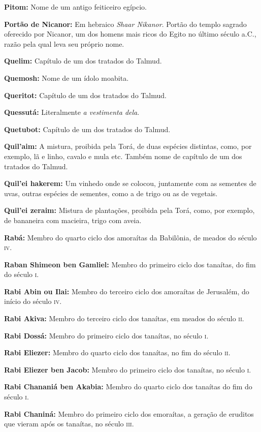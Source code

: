\begin{hangparas}{.25in}{1}
{\textbf{Pitom:} Nome de um antigo feiticeiro egípcio.

\textbf{Portão de Nicanor:} Em hebraico \emph{Shaar Nikanor}. 
Portão do templo sagrado oferecido por Nicanor, um dos homens mais ricos 
do Egito no último século a.C., razão pela qual 
leva seu próprio nome.

\textbf{Quelim:} Capítulo de um dos tratados do Talmud.

\textbf{Quemosh:} Nome de um ídolo moabita.

\textbf{Queritot:} Capítulo de um dos tratados do Talmud.

\textbf{Quessutá:} Literalmente \emph{a vestimenta dela}.

\textbf{Quetubot:} Capítulo de um dos tratados do Talmud.

\textbf{Quil'aim:} A mistura, proibida pela Torá, de duas espécies
distintas, como, por exemplo, lã e linho, cavalo e mula etc. Também
nome de capítulo de um dos tratados do Talmud.

\textbf{Quil'ei hakerem:} Um vinhedo onde se colocou, juntamente 
com as sementes de uvas, 
outras espécies de sementes, como a de trigo ou as de vegetais.

\textbf{Quil'ei zeraim:} Mistura de plantações, proibida pela Torá,
como, por exemplo, de bananeira com macieira, trigo com aveia.

\textbf{Rabá:} Membro do quarto ciclo dos amoraítas da Babilônia, de
meados do século \textsc{iv}.

\textbf{Raban Shimeon ben Gamliel:} Membro do primeiro ciclo dos tanaítas,
do fim do século \textsc{i}.

\textbf{Rabi Abin ou Ilai:} Membro do
terceiro ciclo dos amoraítas de Jerusalém, do início do século \textsc{iv}.

\textbf{Rabi Akiva:} Membro do terceiro ciclo dos tanaítas, em meados do 
século \textsc{ii}.

\textbf{Rabi Dossá:} Membro do primeiro ciclo dos tanaítas, no século \textsc{i}.

\textbf{Rabi Eliezer:} Membro do quarto ciclo dos tanaítas, 
no fim do século \textsc{ii}.

\textbf{Rabi Eliezer ben Jacob:} Membro do primeiro ciclo dos 
tanaítas, no século \textsc{i}.

\textbf{Rabi Chananiá ben Akabia:} Membro do quarto ciclo 
dos tanaítas do fim do século \textsc{i}.

\textbf{Rabi Chaniná:} Membro do primeiro ciclo dos emoraítas, 
a geração de eruditos que vieram após os tanaítas, no século \textsc{iii}.

}
\end{hangparas}
